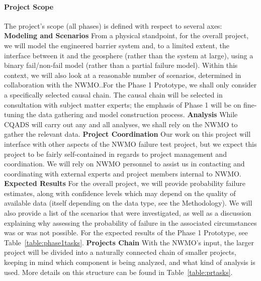 \paragraph{Project Scope} The project's scope (all phases) is defined with respect to several axes:\newl
\textbf{Modeling and Scenarios}\newl
From a physical standpoint, for the overall project, we will model the engineered barrier system and, to a limited extent, the interface between it and the geosphere (rather than the system at large), using a binary fail/non-fail model (rather than a partial failure model). Within this context, we will also look at a reasonable number of scenarios, determined in collaboration with the NWMO..\newl For the Phase 1 Prototype, we shall only consider a specifically selected causal chain. The causal chain will be selected in consultation with subject matter experts; the emphasis of Phase 1 will be on fine-tuning the data gathering and model construction process. \newpage\noindent
\textbf{Analysis}\newl
While CQADS will carry out any and all analyses, we shall rely on the NWMO to gather the relevant data.\newl 
\textbf{Project Coordination}\newl
Our work on this project will interface with other aspects of the NWMO failure test project, but we expect this project to be fairly self-contained in regards to project management and coordination. We will rely on NWMO personnel to assist us in contacting and coordinating with external experts and project members internal to NWMO.\newl
\textbf{Expected Results}\label{sec:to_expect}\newl
For the overall project, we will provide probability failure estimates, along with confidence levels which may depend on the quality of available data (itself depending on the data type, see the Methodology). We will also provide a list of the scenarios that were investigated, as well as a discussion explaining why assessing the probability of failure in the associated circumstances was or was not possible. For the expected results of the Phase 1 Prototype, see Table~\ref{table:phase1tasks}.\newpage\noindent
\textbf{Projects Chain}\label{sec:projects}\newl
With the NWMO's input, the larger project will be divided into a naturally connected chain of smaller projects, keeping in mind which component is being analyzed, and what kind of analysis is used. More details on this structure can be found in Table~\ref{table:prtasks}. 



